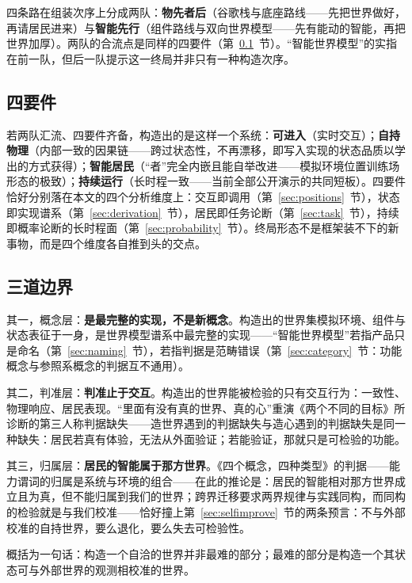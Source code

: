 \documentclass[10pt,fontset=fandol]{ctexart}
\begin{document}
四条路在组装次序上分成两队：\textbf{物先者后}（谷歌栈与底座路线——先把世界做好，再请居民进来）与\textbf{智能先行}（组件路线与双向世界模型——先有能动的智能，再把世界加厚）。两队的合流点是同样的四要件（第~\ref{sec:four}~节）。“智能世界模型”的实指在前一队，但后一队提示这一终局并非只有一种构造次序。

\subsection{四要件}\label{sec:four}

若两队汇流、四要件齐备，构造出的是这样一个系统：\textbf{可进入}（实时交互）；\textbf{自持物理}（内部一致的因果链——跨过状态性，不再漂移，即写入实现的状态品质以学出的方式获得）；\textbf{智能居民}（“者”完全内嵌且能自举改进——模拟环境位置训练场形态的极致）；\textbf{持续运行}（长时程一致——当前全部公开演示的共同短板\cite{deepmind2026genie4}）。四要件恰好分别落在本文的四个分析维度上：交互即调用（第~\ref{sec:positions}~节），状态即实现谱系（第~\ref{sec:derivation}~节），居民即任务论断（第~\ref{sec:task}~节），持续即概率论断的长时程面（第~\ref{sec:probability}~节）。终局形态不是框架装不下的新事物，而是四个维度各自推到头的交点。

\subsection{三道边界}\label{sec:boundaries}

其一，概念层：\textbf{是最完整的实现，不是新概念}。构造出的世界集模拟环境、组件与状态表征于一身，是世界模型谱系中最完整的实现——“智能世界模型”若指产品只是命名（第~\ref{sec:naming}~节），若指判据是范畴错误（第~\ref{sec:category}~节：功能概念与参照系概念的判据互不通用）。

其二，判准层：\textbf{判准止于交互}。构造出的世界能被检验的只有交互行为：一致性、物理响应、居民表现。“里面有没有真的世界、真的心”重演《两个不同的目标》\cite{yu2026twogoals}所诊断的第三人称判据缺失——造世界遇到的判据缺失与造心遇到的判据缺失是同一种缺失：居民若真有体验，无法从外面验证；若能验证，那就只是可检验的功能。

其三，归属层：\textbf{居民的智能属于那方世界}。《四个概念，四种类型》\cite{yu2026fourconcepts}的判据——能力谓词的归属是系统与环境的组合——在此的推论是：居民的智能相对那方世界成立且为真，但不能归属到我们的世界；跨界迁移要求两界规律与实践同构，而同构的检验就是与我们校准——恰好撞上第~\ref{sec:selfimprove}~节的两条预言：不与外部校准的自持世界，要么退化，要么失去可检验性。

概括为一句话：构造一个自洽的世界并非最难的部分；最难的部分是构造一个其状态可与外部世界的观测相校准的世界。
\end{document}
